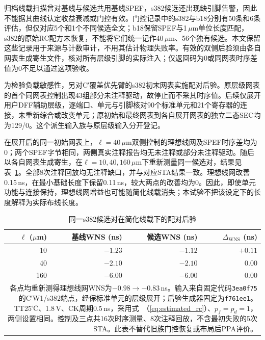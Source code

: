 \documentclass[twocolumn,10pt,fontset=windows]{ctexart}
\renewcommand{\eqref}[1]{\textup{（\ref{#1}）}}
\begin{document}
归档线载扫描曾对基线与候选共用基线SPEF，s382候选还出现缺引脚告警，因此不能据其曲线认定收益衰减或门控有效。门控记录中的s382与b18分别有50条和6条评估，但仅对应5个和1个不同候选全文；b18保留SPEF与1\,$\mu$m单位长度匹配，s382的原始RC配方未恢复，不能将它们统一记作40\,$\mu$m、56个独有候选。本文保留这些记录用于来源与计数审计，不用其估计物理失败率。有效的双侧后验须由各自网表生成寄生文件，核对所有层级引脚的实际注入；仅返回码为0或同网表时序差值为0不足以通过这项验收。

为检验负载敏感性，另对C′覆盖优先臂的s382初末网表实施配对后验。原层级网表的首个同网表控制出现43组部分未注释驱动，故停止而不采其时序值。后续仅展开用户DFF辅助层级，逐端口、单元与引脚核对90个标准单元和21个寄存器的连接，未重新综合或改变单元；原初始和最终网表到各自展开网表的独立二态SEC均为129/0。这个派生输入族与原层级输入分开登记。

在展开后的同一初始网表上，$\ell=40\,\mu$m双侧控制的理想线网及SPEF时序差均为0；两个SPEF字节相同，两侧真实注释报告均无未注释或部分未注释驱动。随后以各自网表生成寄生，在$\ell=10,40,160\,\mu$m下重新测量同一候选对，结果见表~\ref{tab:paired_load}。全部8次注释回放均无注释缺口，并与对应STA结果一致。理想线网改善0.15\,ns，在最小基础长度下保留0.11\,ns，较大两点的改善均为0。因此，即使单元功能与连接保持，理想线网增益也可能随简化线载消失；本试验不把该设定下的长度解释为实际布线长度。

\begin{table}[!htb]
\centering
\caption{同一s382候选对在简化线载下的配对后验}
\label{tab:paired_load}
\footnotesize
\setlength{\tabcolsep}{4pt}
\begin{tabular}{rrrr}
\toprule
$\ell$ ($\mu$m) & 基线WNS (ns) & 候选WNS (ns) & $\Delta_{\mathrm{WNS}}$ (ns) \\
\midrule
10 & $-1.23$ & $-1.12$ & $+0.11$ \\
40 & $-2.10$ & $-2.10$ & $0.00$ \\
160 & $-6.00$ & $-6.00$ & $0.00$ \\
\bottomrule
\multicolumn{4}{p{0.95\columnwidth}}{\footnotesize 各点均重新测得理想线网WNS为$-0.98\to-0.83$\,ns。输入来自固定代码\texttt{3ea0f75}的C′W1/s382端点，经保标准单元的层级展开；后验生成器固定为\texttt{f761ee1}。TT25℃、1.8\,V、CK周期0.5\,ns，采用式~\eqref{eq:estimated_rc}、$p_f=p_d=1$，两侧设置相同。控制及三点共16次时序测量、8次注释回放，不含最初失败的5次STA。此表不替代旧族门控恢复或布局后PPA评价。}\\
\end{tabular}
\end{table}
\end{document}
